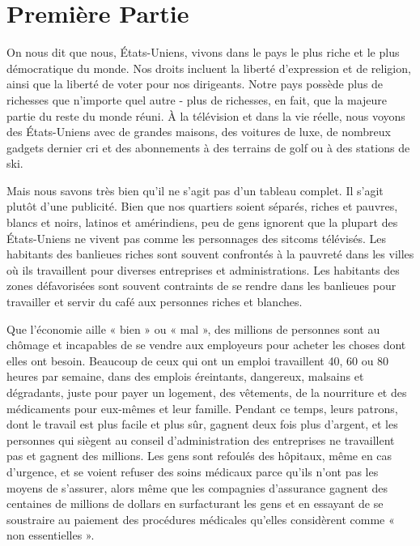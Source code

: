 \chapter*{\textbf{Première Partie}}\hypertarget{premire-partie}{}\label{premire-partie}

On nous dit que nous, États-Uniens, vivons dans le pays le plus riche et le plus démocratique du monde. Nos droits incluent la liberté d'expression et de religion, ainsi que la liberté de voter pour nos dirigeants. Notre pays possède plus de richesses que n'importe quel autre - plus de richesses, en fait, que la majeure partie du reste du monde réuni. À la télévision et dans la vie réelle, nous voyons des États-Uniens avec de grandes maisons, des voitures de luxe, de nombreux gadgets dernier cri et des abonnements à des terrains de golf ou à des stations de ski.

Mais nous savons très bien qu'il ne s'agit pas d'un tableau complet. Il s'agit plutôt d'une publicité. Bien que nos quartiers soient séparés, riches et pauvres, blancs et noirs, latinos et amérindiens, peu de gens ignorent que la plupart des États-Uniens ne vivent pas comme les personnages des sitcoms télévisés. Les habitants des banlieues riches sont souvent confrontés à la pauvreté dans les villes où ils travaillent pour diverses entreprises et administrations. Les habitants des zones défavorisées sont souvent contraints de se rendre dans les banlieues pour travailler et servir du café aux personnes riches et blanches.

Que l'économie aille « bien » ou « mal », des millions de personnes sont au chômage et incapables de se vendre aux employeurs pour acheter les choses dont elles ont besoin. Beaucoup de ceux qui ont un emploi travaillent 40, 60 ou 80 heures par semaine, dans des emplois éreintants, dangereux, malsains et dégradants, juste pour payer un logement, des vêtements, de la nourriture et des médicaments pour eux-mêmes et leur famille. Pendant ce temps, leurs patrons, dont le travail est plus facile et plus sûr, gagnent deux fois plus d'argent, et les personnes qui siègent au conseil d'administration des entreprises ne travaillent pas et gagnent des millions. Les gens sont refoulés des hôpitaux, même en cas d'urgence, et se voient refuser des soins médicaux parce qu'ils n'ont pas les moyens de s'assurer, alors même que les compagnies d'assurance gagnent des centaines de millions de dollars en surfacturant les gens et en essayant de se soustraire au paiement des procédures médicales qu'elles considèrent comme « non essentielles ».

